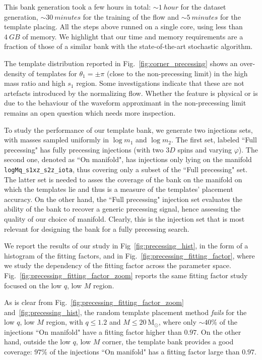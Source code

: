 \documentclass[twocolumn,showpacs,preprintnumbers,nofootinbib,prd,
superscriptaddress,10pt]{revtex4-2}
\begin{document}
This bank generation took a few hours in total: ${\sim \SI{1}{hour}}$ for the dataset generation, ${\sim \SI{30}{minutes}}$ for the training of the flow and ${\sim \SI{5}{minutes}}$ for the template placing.
All the steps above runned on a single core, using less than $\SI{4}{GB}$ of memory.
We highlight that our time and memory requirements are a fraction of those of a similar bank with the state-of-the-art stochastic algorithm.

The template distribution reported in Fig.~\ref{fig:corner_precessing} shows an over-density of templates for $\theta_1 = \pm\pi$ (close to the non-precessing limit) in the high mass ratio and high $s_1$ region. Some investigations indicate that these are not artefacts introduced by the normalizing flow.
Whether the feature is physical or is due to the behaviour of the waveform approximant in the non-precessing limit remains an open question which needs more inspection.

To study the performance of our template bank, we generate two injections sets, with masses sampled uniformly in $\log m_1$ and $\log m_2$.
The first set, labeled ``Full precessing" has fully precessing injections (with two $3D$ spins and varying $\varphi$). The second one, denoted as ``On manifold", has injections only lying on the manifold \texttt{logMq\_s1xz\_s2z\_iota}, thus covering only a subset of the ``Full precessing" set.
The latter set is needed to asses the coverage of the bank on the manifold on which the templates lie and thus is a measure of the templates' placement accuracy.
On the other hand, the ``Full precessing" injection set evaluates the ability of the bank to recover a generic precessing signal, hence assessing the quality of our choice of manifold.
Clearly, this is the injection set that is most relevant for designing the bank for a fully precessing search.

We report the results of our study in Fig~\ref{fig:precessing_hist}, in the form of a histogram of the fitting factors, and in Fig.~\ref{fig:precessing_fitting_factor}, where we study the dependency of the fitting factor across the parameter space.
Fig.~\ref{fig:precessing_fitting_factor_zoom} reports the same fitting factor study focused on the low $q$, low $M$ region.

As is clear from Fig.~\ref{fig:precessing_fitting_factor_zoom} and~\ref{fig:precessing_hist}, the random template placement method {\it fails} for the low $q$, low $M$ region, with $q \leq 1.2$ and $M \leq \SI{20}{\mathrm{M_\odot}}$, where only $\sim 40\%$ of the injections ``On manifold" have a fitting factor higher than $0.97$.
On the other hand, outside the low $q$, low $M$ corner, the template bank provides a good coverage: $97\%$ of the injections ``On manifold" has a fitting factor large than $0.97$.
\end{document}
